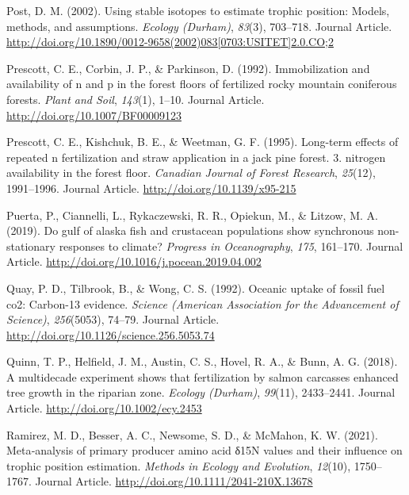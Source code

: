 \documentclass [11pt, proquest] {uwthesis}[2015/03/03]
\begin{document}
\hypertarget{ref-Post2002}{}
Post, D. M. (2002). Using stable isotopes to estimate trophic position:
Models, methods, and assumptions. \emph{Ecology (Durham)}, \emph{83}(3),
703--718. Journal Article.
\href{http://doi.org/10.1890/0012-9658(2002)083\%5B0703:USITET\%5D2.0.CO;2}{http://doi.org/10.1890/0012-9658(2002)083{[}0703:USITET{]}2.0.CO;2}

\hypertarget{ref-Prescott1992}{}
Prescott, C. E., Corbin, J. P., \& Parkinson, D. (1992). Immobilization
and availability of n and p in the forest floors of fertilized rocky
mountain coniferous forests. \emph{Plant and Soil}, \emph{143}(1),
1--10. Journal Article. \url{http://doi.org/10.1007/BF00009123}

\hypertarget{ref-Prescott1995}{}
Prescott, C. E., Kishchuk, B. E., \& Weetman, G. F. (1995). Long-term
effects of repeated n fertilization and straw application in a jack pine
forest. 3. nitrogen availability in the forest floor. \emph{Canadian
Journal of Forest Research}, \emph{25}(12), 1991--1996. Journal Article.
\url{http://doi.org/10.1139/x95-215}

\hypertarget{ref-Puerta2019}{}
Puerta, P., Ciannelli, L., Rykaczewski, R. R., Opiekun, M., \& Litzow,
M. A. (2019). Do gulf of alaska fish and crustacean populations show
synchronous non-stationary responses to climate? \emph{Progress in
Oceanography}, \emph{175}, 161--170. Journal Article.
\url{http://doi.org/10.1016/j.pocean.2019.04.002}

\hypertarget{ref-Quay1992}{}
Quay, P. D., Tilbrook, B., \& Wong, C. S. (1992). Oceanic uptake of
fossil fuel co2: Carbon-13 evidence. \emph{Science (American Association
for the Advancement of Science)}, \emph{256}(5053), 74--79. Journal
Article. \url{http://doi.org/10.1126/science.256.5053.74}

\hypertarget{ref-Quinn2018}{}
Quinn, T. P., Helfield, J. M., Austin, C. S., Hovel, R. A., \& Bunn, A.
G. (2018). A multidecade experiment shows that fertilization by salmon
carcasses enhanced tree growth in the riparian zone. \emph{Ecology
(Durham)}, \emph{99}(11), 2433--2441. Journal Article.
\url{http://doi.org/10.1002/ecy.2453}

\hypertarget{ref-Ramirez2021}{}
Ramirez, M. D., Besser, A. C., Newsome, S. D., \& McMahon, K. W. (2021).
Meta‐analysis of primary producer amino acid δ15N values and their
influence on trophic position estimation. \emph{Methods in Ecology and
Evolution}, \emph{12}(10), 1750--1767. Journal Article.
\url{http://doi.org/10.1111/2041-210X.13678}
\end{document}
